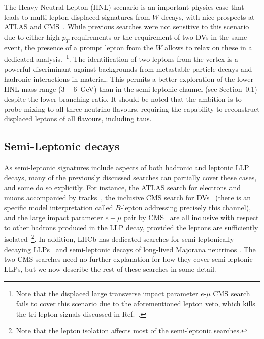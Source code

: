 The Heavy Neutral Lepton (HNL) scenario is an important physics case that leads to multi-lepton displaced signatures from $W$ decays, with nice prospects at ATLAS and CMS~\cite{Izaguirre2015}. While previous searches were not sensitive to this scenario due to either high-$p_T$ requirements or the requirement of two DVs in the same event, the presence of a prompt lepton from the $W$ allows to relax on these in a dedicated analysis.~\footnote{Note that the displaced large transverse impact parameter $e$-$\mu$ CMS search~\cite{CMS-PAS-EXO-16-022} fails to cover this scenario due to the aforementioned lepton veto, which kills the tri-lepton signals discussed in Ref.~\cite{Izaguirre2015}. }.
The identification of two leptons from the vertex is a powerful discriminant against backgrounds from metastable particle decays and hadronic interactions in material. This permits a better exploration of the lower HNL mass range ($3-6$~GeV) than in the semi-leptonic channel (see Section~\ref{subsec:dsemilep}) despite the lower branching ratio. It should be noted that the ambition is to probe mixing to all three neutrino flavours, requiring the capability to reconstruct displaced leptons of all flavours, including taus.

\subsection{Semi-Leptonic decays}
\label{subsec:dsemilep}

As semi-leptonic signatures include aspects of both hadronic and leptonic LLP decays, many of the previously discussed searches can partially cover these cases, and some do so explicitly. For instance, the ATLAS search for electrons and muons accompanied by tracks~\cite{Aad:2015rba}, the inclusive CMS search for DVs~\cite{CMS:2017oor} (there is an specific model interpretation called $B$-lepton addressing precisely this channel), and the large impact parameter $e-\mu$ pair by CMS~\cite{CMS-PAS-EXO-16-022} are all inclusive with respect to other hadrons produced in the LLP decay, provided the leptons are sufficiently isolated~\footnote{Note that the lepton isolation affects most of the semi-leptonic searches.}. In addition, LHCb has dedicated searches for semi-leptonically decaying  LLPs~\cite{Aaij:2016xmb} and semi-leptonic decays of long-lived Majorana neutrinos \cite{Aaij:2014aba}.   The two CMS searches \cite{CMS:2017oor,CMS-PAS-EXO-16-022} need no further explanation for how they cover semi-leptonic LLPs, but we now describe the rest of these searches in some detail.

